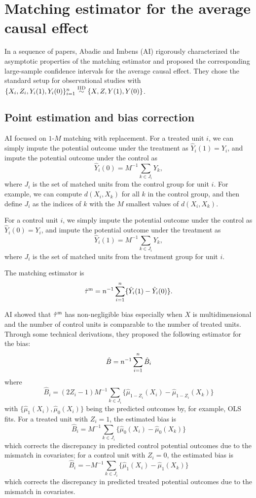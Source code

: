  

\section{Matching estimator for the average causal effect}

In a sequence of papers, Abadie and Imbens (AI) rigorously characterized the asymptotic properties of the matching estimator and proposed the corresponding large-sample confidence intervals for the average causal effect. 
They chose the standard setup for observational studies with  $\{ X_i , Z_i ,Y_i(1), Y_i(0)  \}_{i=1}^n \stackrel{\textup{IID}}{\sim} \{ X, Z, Y(1), Y(0) \}$.  

\subsection{Point estimation and bias correction}

AI focused on $1$-$M$ matching with replacement. For a treated unit $i$, we can simply impute the potential outcome under the treatment as $\hat{Y}_i(1) = Y_i$, and impute the potential outcome under the control as 
$$
\hat{Y}_i(0) = M^{-1} \sum_{k\in J_i} Y_k,
$$
where $J_i$ is the set of matched units from the control group for unit $i$. For example, we can compute $d(X_i, X_k)$ for all $k$ in the control group, and then define $J_i$ as the indices of $k$ with the $M$ smallest values of $d(X_i, X_k)$. 




For a control unit $i$, we simply impute the potential outcome under the control as $\hat{Y}_i(0) = Y_i$, and impute the potential outcome under the treatment as
$$
\hat{Y}_i(1) = M^{-1} \sum_{k\in J_i} Y_k,
$$
where $J_i$ is the set of matched units from the treatment group for unit $i$.

The matching estimator is 
$$
\hat{\tau}^\textup{m} = n^{-1} \sum_{i=1}^n \{\hat{Y}_i(1) -\hat{Y}_i(0) \}.
$$

AI showed that $\hat{\tau}^\textup{m}$ has non-negligible bias especially when $X$ is multidimensional and the number of control units is comparable to the number of treated units. Through some technical derivations,  they proposed the following estimator for the bias: 
$$
\hat{B} = n^{-1} \sum_{i=1}^n  \hat{B}_i
$$
where
$$
\hat{B}_i = (2Z_i - 1) M^{-1} \sum_{k\in J_i} \{  \hat{\mu}_{1-Z_i}(X_i) -  \hat{\mu}_{1-Z_i}(X_k)     \}
$$
with $\{  \hat{\mu}_1(X_i), \hat{\mu}_0(X_i) \}$ being the predicted outcomes by, for example, OLS fits. 
For a treated unit with $Z_i  =1$, the estimated bias is
$$
\hat{B}_i = M^{-1} \sum_{k\in J_i} \{  \hat{\mu}_{0}(X_i) -  \hat{\mu}_{0}(X_k)     \}
$$
which corrects the discrepancy in predicted control potential outcomes due to the mismatch in covariates; for a control unit with $Z_i = 0$, the estimated bias is
 $$
\hat{B}_i =  - M^{-1} \sum_{k\in J_i} \{  \hat{\mu}_{1}(X_i) -  \hat{\mu}_{1}(X_k)     \}
$$
which corrects the discrepancy in predicted treated potential outcomes due to the mismatch in covariates. 


